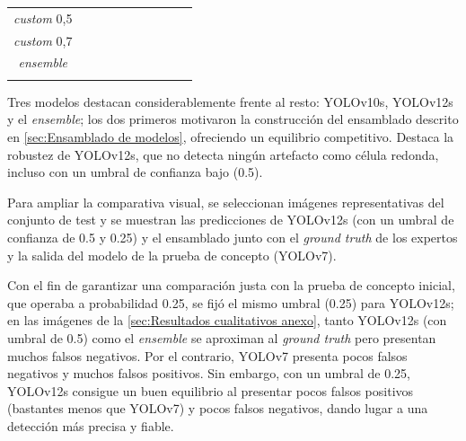 \documentclass[12pt,a4paper,onecolumn,oneside]{report}
\begin{document}
\begin{table}[ht]
{\begin{tabular}{!{\vrule width 1.2pt}c|c|c|c|c|c|c|c|c|c!{\vrule width 1.2pt}}
\hline
\textit{custom} 0,5        &  &  &  &  &  &  &  &  &  \\
\hline
\textit{custom} 0,7        &  &  &  &  &  &  &  &  &  \\
\hline
\textit{ensemble}       &  &  &  &  &  &  &  &  &  \\
\hline
\end{tabular}
}
\label{tab:resultados_artefactos}
\end{table}

Tres modelos destacan considerablemente frente al resto: YOLOv10s, YOLOv12s y el \textit{ensemble}; los dos primeros motivaron la construcción del ensamblado descrito en 
\autoref{sec:Ensamblado de modelos}, ofreciendo un equilibrio competitivo. Destaca la robustez de YOLOv12s, que no detecta ningún artefacto como célula redonda, incluso con un umbral de confianza bajo (0.5).

Para ampliar la comparativa visual, se seleccionan imágenes representativas del conjunto de test y se muestran las predicciones de YOLOv12s (con un umbral de confianza de 0.5 y 0.25) y el ensamblado junto con el
\textit{ground truth} de los expertos y la salida del modelo de la prueba de concepto (YOLOv7). 

Con el fin de garantizar una comparación justa con la prueba de concepto inicial, que operaba a probabilidad 0.25, se fijó el mismo umbral (0.25) para YOLOv12s; 
en las imágenes de la \autoref{sec:Resultados cualitativos anexo}, tanto YOLOv12s (con umbral de 0.5) como el \textit{ensemble} se aproximan al \textit{ground truth} pero presentan muchos falsos negativos. Por el contrario, YOLOv7 presenta pocos falsos negativos y muchos falsos positivos.
Sin embargo, con un umbral de 0.25, YOLOv12s consigue un buen equilibrio al presentar pocos falsos positivos (bastantes menos que YOLOv7) y pocos falsos negativos, dando lugar a una detección más precisa y fiable.
\end{document}
